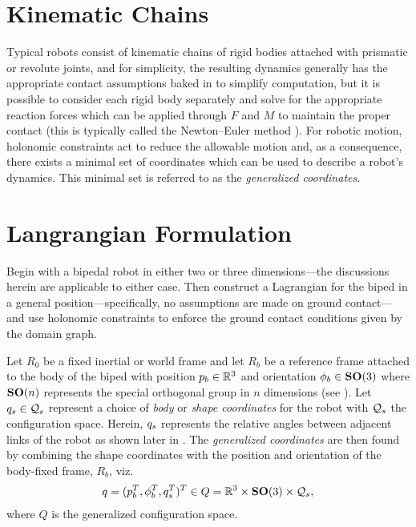 \section{Kinematic Chains}

Typical robots consist of kinematic chains of rigid bodies attached with prismatic or revolute joints, and for simplicity, the resulting dynamics generally has the appropriate contact assumptions baked in to simplify computation, but it is possible to consider each rigid body separately and solve for the appropriate reaction forces which can be applied through $F$ and $M$ to maintain the proper contact (this is typically called the Newton--Euler method \cite{Hollerbach80}).
%
For robotic motion, holonomic constraints act to reduce the allowable motion and, as a consequence, there exists a minimal set of coordinates which can be used to describe a robot's dynamics.
%
This minimal set is referred to as the {\em generalized coordinates}.


\section{Langrangian Formulation}

%
%


Begin with a bipedal robot in either two or three dimensions---the discussions herein are applicable to either case.
%
Then construct a Lagrangian for the biped in a general position---specifically, no assumptions are made on ground contact---and use holonomic constraints to enforce the ground contact conditions given by the domain graph.

Let $R_{0}$ be a fixed inertial or world frame and let $R_{b}$ be a reference frame attached to the body of the biped with position $p_{b} \in \mathbb{R}^{3}$ and orientation $\phi_{b} \in \mathbf{SO}(3)$ where $\mathbf{SO}(n)$ represents the special orthogonal group in $n$ dimensions (see \cite{CCNPW86}).
%
Let $q_{s} \in \mathcal{Q}_{s}$ represent a choice of {\em body} or {\em shape coordinates} for the robot with $\mathcal{Q}_{s}$ the configuration space.
%
Herein, $q_{s}$ represents the relative angles between adjacent links of the robot as shown later in .
%
The {\em generalized coordinates} are then found by combining the shape coordinates with the position and orientation of the body-fixed frame, $R_{b}$, viz.
%
\begin{align}
  q = (p_{b}^{T}, \phi_{b}^{T}, q_{s}^{T})^{T} \in Q = \mathbb{R}^{3} \times \mathbf{SO}(3) \times \mathcal{Q}_{s},
\end{align}
%
where $Q$ is the generalized configuration space.

